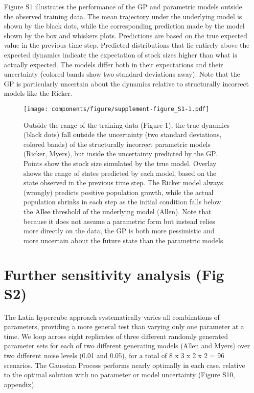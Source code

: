 \documentclass[]{components/elsarticle}
\begin{document}
Figure S1 illustrates the performance of the GP and parametric models
outside the observed training data. The mean trajectory under the
underlying model is shown by the black dots, while the corresponding
prediction made by the model shown by the box and whiskers plots.
Predictions are based on the true expected value in the previous time
step. Predicted distributions that lie entirely above the expected
dynamics indicate the expectation of stock sizes higher than what is
actually expected. The models differ both in their expectations and
their uncertainty (colored bands show two standard deviations away).
Note that the GP is particularly uncertain about the dynamics relative
to structurally incorrect models like the Ricker.

\begin{figure}[htbp]
\centering
\texttt{[image: components/figure/supplement-figure\_S1-1.pdf]}
\caption{Outside the range of the training data (Figure 1), the true
dynamics (black dots) fall outside the uncertainty (two standard
deviations, colored bands) of the structurally incorrect parametric
models (Ricker, Myers), but inside the uncertainty predicted by the GP.
Points show the stock size simulated by the true model. Overlay shows
the range of states predicted by each model, based on the state observed
in the previous time step. The Ricker model always (wrongly) predicts
positive population growth, while the actual population shrinks in each
step as the initial condition falls below the Allee threshold of the
underlying model (Allen). Note that because it does not assume a
parametric form but instead relies more directly on the data, the GP is
both more pessimistic and more uncertain about the future state than the
parametric models.}
\end{figure}

\newpage

\section{Further sensitivity analysis (Fig
S2)}\label{further-sensitivity-analysis-fig-s2}

The Latin hypercube approach systematically varies all combinations of
parameters, providing a more general test than varying only one
parameter at a time. We loop across eight replicates of three different
randomly generated parameter sets for each of two different generating
models (Allen and Myers) over two different noise levels (0.01 and
0.05), for a total of 8 x 3 x 2 x 2 = 96 scenarios. The Gaussian Process
performs nearly optimally in each case, relative to the optimal solution
with no parameter or model uncertainty (Figure S10, appendix).
\end{document}
